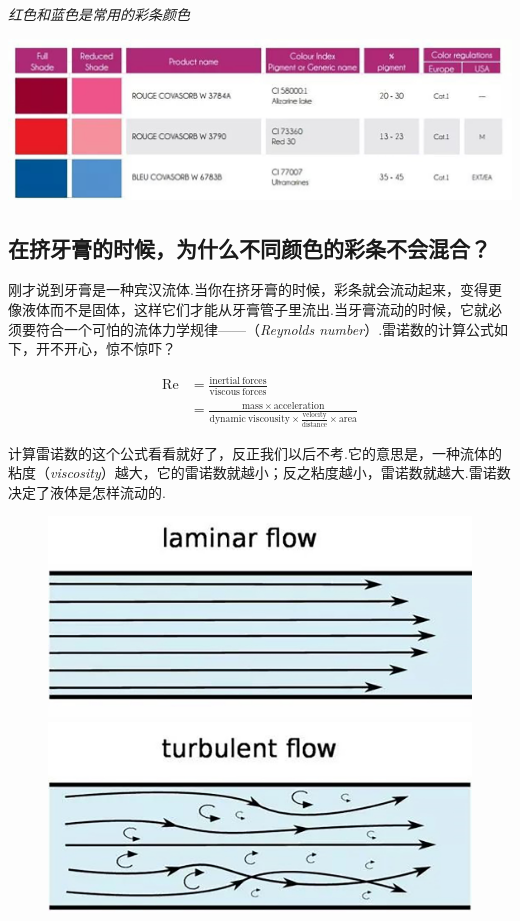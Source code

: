 \begin{table}[h]
    \centering
    \caption{\textit{红色和蓝色是常用的彩条颜色}}
\includegraphics[width=0.9\linewidth]{IMG/201907/05.jpg}
    
    
\end{table}

\begin{multicols}{2}
\section*{在挤牙膏的时候，为什么不同颜色的彩条不会混合？}

刚才说到牙膏是一种宾汉流体.当你在挤牙膏的时候，彩条就会流动起来，变得更像液体而不是固体，这样它们才能从牙膏管子里流出.当牙膏流动的时候，它就必须要符合一个可怕的流体力学规律——（\textit{Reynolds number}\/）.雷诺数的计算公式如下，开不开心，惊不惊吓？

\[
\begin{split}
\mathrm{Re}&=\mathrm{\frac{inertial\ forces}{viscous\ forces}}\\
&=\mathrm{\frac{mass \times acceleration}{dynamic\ viscousity\times \frac{velocity}{distance}\times area}}
\end{split}
\]

计算雷诺数的这个公式看看就好了，反正我们以后不考.它的意思是，一种流体的粘度（\textit{viscosity}\/）越大，它的雷诺数就越小；反之粘度越小，雷诺数就越大.雷诺数决定了液体是怎样流动的.

\begin{figure}[H]
    \centering
    \includegraphics[width=0.5\linewidth]{IMG/201907/07.jpg}\\\includegraphics[width=0.5\linewidth]{IMG/201907/08.jpg}


\end{figure}
\end{multicols}
